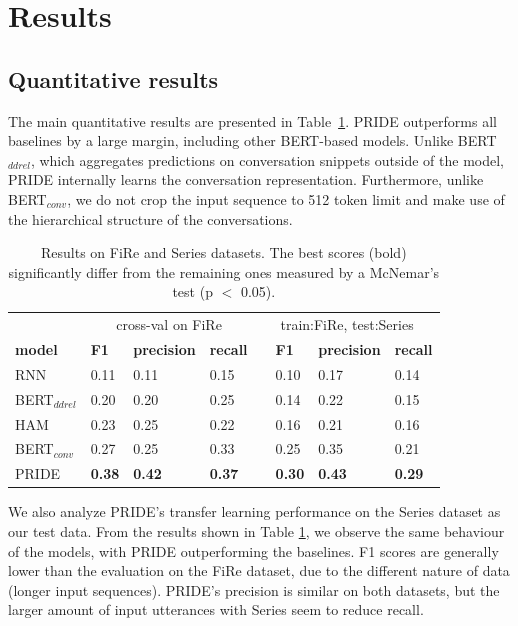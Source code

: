 \section{Results}

\subsection{Quantitative results}
The main quantitative results are presented in \mbox{Table \ref{tab:main_exp}}. PRIDE outperforms all baselines by a large margin, including other BERT-based models.
Unlike BERT$_{ddrel}$, which aggregates predictions on conversation snippets outside of the model, PRIDE internally learns the conversation representation.
Furthermore, unlike BERT$_{conv}$, we do not crop the input sequence to 512 token limit and make use of the hierarchical structure of the conversations.

\begin{table}[]
\centering
\begin{adjustbox}{width=0.7\textwidth}
\begin{tabular}{@{}llllllll@{}}
 & \multicolumn{3}{c}{cross-val on FiRe} & \multicolumn{4}{c}{train:FiRe, test:Series} \\
 \cmidrule(lr){2-4} \cmidrule(lr){5-8}
\textbf{model}           & \textbf{F1}   & \textbf{precision} & \textbf{recall} & &  \textbf{F1}   & \textbf{precision} & \textbf{recall} \\ \toprule
RNN             & 0.11 & 0.11      & 0.15  & & 0.10 & 0.17 & 0.14 \\
BERT$_{ddrel}$ & 0.20 & 0.20      & 0.25   & & 0.14 & 0.22 & 0.15 \\
HAM             & 0.23 & 0.25      & 0.22  & & 0.16 & 0.21 & 0.16 \\
BERT$_{conv}$  & 0.27 & 0.25      & 0.33   & & 0.25 & 0.35 & 0.21 \\ \midrule
PRIDE           & \textbf{0.38} & \textbf{0.42}      & \textbf{0.37} & & \textbf{0.30} & \textbf{0.43}      & \textbf{0.29}\\
\end{tabular}
\end{adjustbox}
\caption{Results on FiRe and Series datasets. The best scores (bold) significantly differ from the remaining ones measured by a McNemar’s test (p $<$ 0.05).}
\label{tab:main_exp}
\end{table}

We also analyze PRIDE's transfer learning performance on the Series dataset as our test data. 
From the results shown in Table \ref{tab:main_exp}, we observe the same behaviour of the models, with PRIDE outperforming the baselines. 
F1 scores are generally lower than the evaluation on the FiRe dataset, 
due to the different nature of data (longer input sequences). 
PRIDE's precision is similar on both datasets, but the larger amount of input utterances with Series seem to reduce recall.

